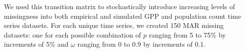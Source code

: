 \documentclass{article}
\begin{document}


\noindent We used this transition matrix to stochastically introduce increasing levels of missingness into both empirical and simulated GPP and population count time series datasets. For each unique time series, we created 150 MAR missing datasets: one for each possible combination of $p$ ranging from 5 to 75\% by increments of 5\% and $\omega$ ranging from 0 to 0.9 by increments of 0.1.  
\end{document}
